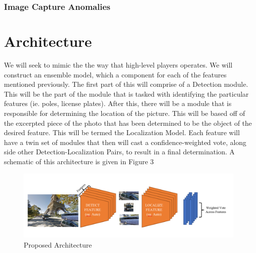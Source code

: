 \documentclass{article}
\begin{document}
\begin{multicols}{2}
	\subsubsection{Image Capture Anomalies}
	
	\section{Architecture}
	
	We will seek to mimic the the way that high-level players operates. We will construct an ensemble model, which a component for each of the features mentioned previously. 
	The first part of this will comprise of a Detection module. This will be the part of the module that is tasked with identifying the particular features (ie. poles, license plates).
	After this, there will be a module that is responsible for determining the location of the picture. This will be based off of the excerpted piece of the photo that has been determined to be the object of the desired feature. This will be termed the Localization Model. 
	Each feature will have a twin set of modules that then will cast a confidence-weighted vote, along side other Detection-Localization Pairs, to result in a final determination. A schematic of this architecture is given in Figure 3
	
	\begin{figure}
		\includegraphics[width=\textwidth]{architecture.png}
		\caption{Proposed Architecture}
	\end{figure}






	\end{multicols}
	
\end{document}
